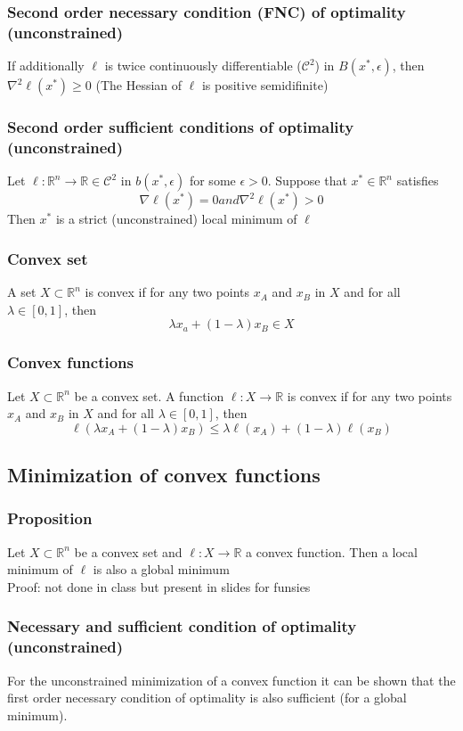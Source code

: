 \documentclass{book}
\newcommand{\R}{\mathbb{R}}
\begin{document}
\subsubsection{Second order necessary condition (FNC) of optimality (unconstrained)}
If additionally $\ell$ is twice continuously differentiable ($\mathcal{C}^2$) in $B(x^*,\epsilon)$, then $\nabla^2 \ell(x^*)\geq 0$ (The Hessian of $\ell$ is positive semidifinite)
\subsubsection{Second order sufficient conditions of optimality (unconstrained)}
Let $\ell:\R^n\to\R\in\mathcal{C}^2$ in $b(x^*,\epsilon)$ for some $\epsilon>0$. Suppose that $x^*\in\R^n$ satisfies 
\[
    \nabla\ell(x^*) = 0 and \nabla^2\ell(x^*)>0
\]
Then $x^*$ is a strict (unconstrained) local minimum of $\ell$
\subsubsection{Convex set} 
A set $X\subset \R^n$ is convex if for any two points $x_A$ and $x_B$ in $X$ and for all $\lambda\in[0,1]$, then 
\[
    \lambda x_a+(1-\lambda)x_B \in X
\]
\subsubsection{Convex functions}
Let $X \subset \R^n$ be a convex set. A function $\ell:X\to\R$ is convex if for any two points $x_A$ and $x_B$ in $X$ and for all $\lambda\in[0,1]$, then 
\[
    \ell(\lambda x_A + (1-\lambda)x_B)\leq \lambda\ell(x_A)+ (1-\lambda)\ell(x_B)
\]
\subsection{Minimization of convex functions}
\subsubsection{Proposition}
Let $X\subset\R^n$ be a convex set and $\ell: X\to\R$ a convex function. Then a local minimum of $\ell$ is also a global minimum \\
Proof: not done in class but present in slides for funsies
\subsubsection{Necessary and sufficient condition of optimality (unconstrained)}
For the unconstrained minimization of a convex function it can be shown that the first order necessary condition of optimality is also sufficient (for a global minimum).
\end{document}
